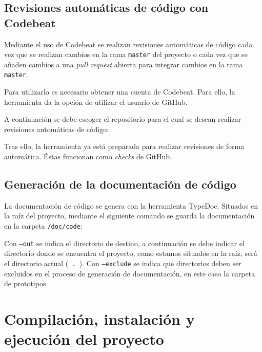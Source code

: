 
\subsection{Revisiones automáticas de código con Codebeat}

Mediante el uso de Codebeat se realizan revisiones automáticas de código cada vez que se realizan cambios en la rama \texttt{master} del proyecto o cada vez que se añaden cambios a una \textit{pull request} abierta para integrar cambios en la rama \texttt{master}.

Para utilizarlo es necesario obtener una cuenta de Codebeat. Para ello, la herramienta da la opción de utilizar el usuario de GitHub.

A continuación se debe escoger el repositorio para el cual se desean realizar revisiones automáticas de código:


Tras ello, la herramienta ya está preparada para realizar revisiones de forma automática. Éstas funcionan como \textit{checks} de GitHub.


\subsection{Generación de la documentación de código}

La documentación de código se genera con la herramienta TypeDoc. Situados en la raíz del proyecto, mediante el siguiente comando se guarda la documentación en la carpeta \texttt{/doc/code}:


Con \texttt{--out} se indica el directorio de destino, a continuación se debe indicar el directorio donde se encuentra el proyecto, como estamos situados en la raíz, será el directorio actual (\texttt{ . }). Con \texttt{--exclude} se indica que directorios deben ser excluidos en el proceso de generación de documentación, en este caso la carpeta de prototipos.

\section{Compilación, instalación y ejecución del proyecto}

